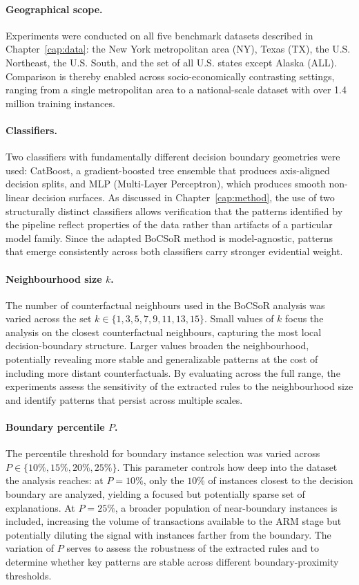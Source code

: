 \paragraph{Geographical scope.} Experiments were conducted on all five benchmark datasets described in Chapter~\ref{cap:data}: the New York metropolitan area (NY), Texas (TX), the U.S. Northeast, the U.S. South, and the set of all U.S. states except Alaska (ALL). Comparison is thereby enabled across socio-economically contrasting settings, ranging from a single metropolitan area to a national-scale dataset with over 1.4 million training instances.

\paragraph{Classifiers.} Two classifiers with fundamentally different decision boundary geometries were used: CatBoost, a gradient-boosted tree ensemble that produces axis-aligned decision splits, and MLP (Multi-Layer Perceptron), which produces smooth non-linear decision surfaces. As discussed in Chapter~\ref{cap:method}, the use of two structurally distinct classifiers allows verification that the patterns identified by the pipeline reflect properties of the data rather than artifacts of a particular model family. Since the adapted BoCSoR method is model-agnostic, patterns that emerge consistently across both classifiers carry stronger evidential weight.

\paragraph{Neighbourhood size $k$.} The number of counterfactual neighbours used in the BoCSoR analysis was varied across the set $k \in \{1, 3, 5, 7, 9, 11, 13, 15\}$. Small values of $k$ focus the analysis on the closest counterfactual neighbours, capturing the most local decision-boundary structure. Larger values broaden the neighbourhood, potentially revealing more stable and generalizable patterns at the cost of including more distant counterfactuals. By evaluating across the full range, the experiments assess the sensitivity of the extracted rules to the neighbourhood size and identify patterns that persist across multiple scales.

\paragraph{Boundary percentile $P$.} The percentile threshold for boundary instance selection was varied across $P \in \{10\%, 15\%, 20\%, 25\%\}$. This parameter controls how deep into the dataset the analysis reaches: at $P = 10\%$, only the $10\%$ of instances closest to the decision boundary are analyzed, yielding a focused but potentially sparse set of explanations. At $P = 25\%$, a broader population of near-boundary instances is included, increasing the volume of transactions available to the ARM stage but potentially diluting the signal with instances farther from the boundary. The variation of $P$ serves to assess the robustness of the extracted rules and to determine whether key patterns are stable across different boundary-proximity thresholds.

